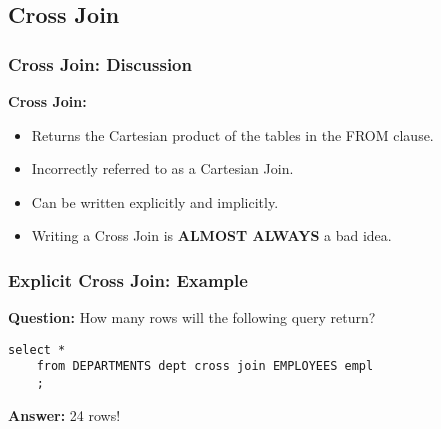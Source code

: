 \documentclass{beamer}
\begin{document}
\subsection{Cross Join} %

\begin{frame} %
  \frametitle{Cross Join: Discussion}

  \textbf{Cross Join:}

  \bigskip
  \begin{itemize}
  \item Returns the Cartesian product of the tables in the FROM
    clause.
  \item Incorrectly referred to as a Cartesian Join. 
  \item Can be written explicitly and implicitly.
  \item Writing a Cross Join is {\color{red} \textbf{ALMOST ALWAYS}} a bad idea.
  \end{itemize}
\end{frame}

\begin{frame}[fragile] %
  \frametitle{Explicit Cross Join: Example}

  \textbf{Question:} How many rows will the following query return?
  \bigskip

  \begin{lstlisting}[title={\tiny Source: https://github.com/Choens/sql-survival-guide/blob/master/sql/04-joins/cross-join.sql}]
    select *
    from DEPARTMENTS dept cross join EMPLOYEES empl
    ;
  \end{lstlisting}
  
  \bigskip
  \bigskip
  \pause 
  \textbf{Answer:} 24 rows!
  
\end{frame}
\end{document}
